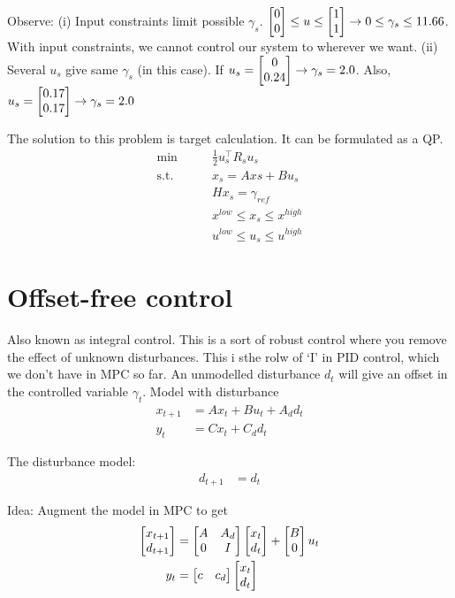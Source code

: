 \documentclass{article}
\begin{document}
\medskip Observe: (i) Input constraints limit possible $\gamma_s$. $\begin{bmatrix} 0 \\ 0 \end{bmatrix} \leq u \leq \begin{bmatrix} 1 \\ 1 \end{bmatrix} \rightarrow 0 \leq \gamma_s  \leq 11.66$. With input constraints,
we cannot control our system to wherever we want. (ii) Several $u_s$ give same $\gamma_s$ (in this case). If $u_s = \begin{bmatrix} 0 \\ 0.24 \end{bmatrix} \rightarrow \gamma_s = 2.0$. Also, $u_s = \begin{bmatrix} 0.17 \\ 0.17 \end{bmatrix}  \rightarrow \gamma_s = 2.0$

\medskip The solution to this problem is target calculation. It can be formulated as a QP.
\begin{align*}
  \min\qquad        & \frac{1}{2}u_s^{\top}R_s u_s    \\
  \text{s.t.}\qquad & x_s = Axs + Bu_s                \\
                    & Hx_s = \gamma_{ref}             \\
                    & x^{low}  \leq x_s \leq x^{high} \\
                    & u^{low} \leq u_s  \leq u^{high}
\end{align*}

\section{Offset-free control}

Also known as integral control. This is a sort of robust control where you remove the effect of unknown 
disturbances. This i sthe rolw of `I' in PID control, which we don't have in MPC so far.
An unmodelled disturbance $d_t$ will give an offset in the controlled variable $\gamma_t$. Model with disturbance
\begin{align*}
  x_{t+1} &= Ax_t + Bu_t + A_d d_t \\ 
  y_t &= Cx_t + C_d d_t
\end{align*}

The disturbance model:
\begin{align*}
  d_{t+1} & = d_t 
\end{align*}

Idea: Augment the model in MPC to get
\begin{align*}
  \begin{bmatrix} x_{t+1} \\ d_{t+1} \end{bmatrix} &= \begin{bmatrix} A & A_d  \\ 0 & I \end{bmatrix}\begin{bmatrix} x_t \\ d_t \end{bmatrix} + \begin{bmatrix} B \\ 0 \end{bmatrix}u_t \\ 
  y_t &= \begin{bmatrix} c & c_d \end{bmatrix}\begin{bmatrix} x_t \\ d_t \end{bmatrix} 
\end{align*}
\end{document}
